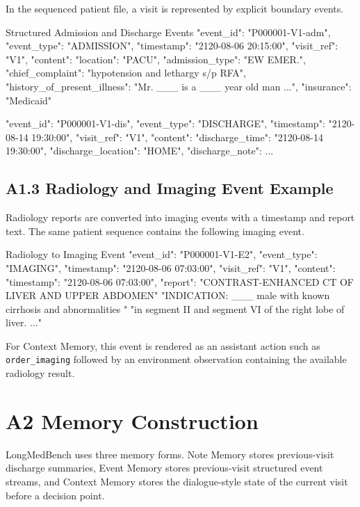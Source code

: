 In the sequenced patient file, a visit is represented by explicit boundary events.

\begin{promptblock}{Structured Admission and Discharge Events}
{
  "event_id": "P000001-V1-adm",
  "event_type": "ADMISSION",
  "timestamp": "2120-08-06 20:15:00",
  "visit_ref": "V1",
  "content": {
    "location": "PACU",
    "admission_type": "EW EMER.",
    "chief_complaint": "hypotension and lethargy s/p RFA",
    "history_of_present_illness": "Mr. ___ is a ___ year old man ...",
    "insurance": "Medicaid"
  }
}

{
  "event_id": "P000001-V1-dis",
  "event_type": "DISCHARGE",
  "timestamp": "2120-08-14 19:30:00",
  "visit_ref": "V1",
  "content": {
    "discharge_time": "2120-08-14 19:30:00",
    "discharge_location": "HOME",
    "discharge_note": {...}
  }
}
\end{promptblock}

\subsection*{A1.3 Radiology and Imaging Event Example}

Radiology reports are converted into imaging events with a timestamp and report text. The same patient sequence contains the following imaging event.

\begin{promptblock}{Radiology to Imaging Event}
{
  "event_id": "P000001-V1-E2",
  "event_type": "IMAGING",
  "timestamp": "2120-08-06 07:03:00",
  "visit_ref": "V1",
  "content": {
    "timestamp": "2120-08-06 07:03:00",
    "report": "CONTRAST-ENHANCED CT OF LIVER AND UPPER ABDOMEN\n\n"
              "INDICATION: ___ male with known cirrhosis and abnormalities "
              "in segment II and segment VI of the right lobe of liver. ..."
  }
}
\end{promptblock}

For Context Memory, this event is rendered as an assistant action such as \texttt{order\_imaging} followed by an environment observation containing the available radiology result.

\section*{A2 Memory Construction}

LongMedBench uses three memory forms. Note Memory stores previous-visit discharge summaries, Event Memory stores previous-visit structured event streams, and Context Memory stores the dialogue-style state of the current visit before a decision point.


